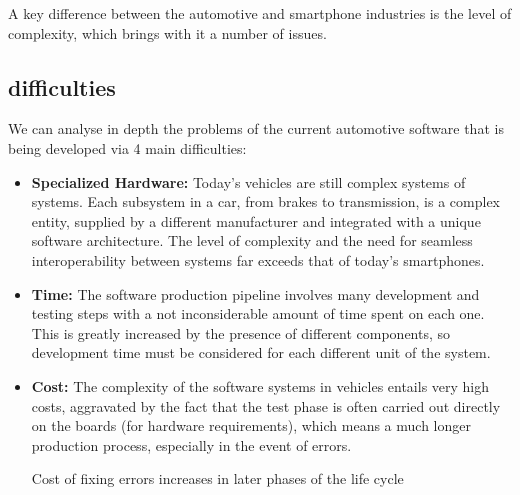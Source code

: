A key difference between the automotive and smartphone industries is the level of complexity, which brings with it a number of issues.

\subsection{difficulties}
We can analyse in depth the problems of the current automotive software that is being developed via 4 main difficulties:

\begin{itemize}
    \item \textbf{Specialized Hardware:} Today's vehicles are still complex systems of systems. Each subsystem in a car, from brakes to transmission, is a complex entity, supplied by a different manufacturer and integrated with a unique software architecture. The level of complexity and the need for seamless interoperability between systems far exceeds that of today's smartphones.
    \item \textbf{Time:} The software production pipeline involves many development and testing steps with a not inconsiderable amount of time spent on each one. This is greatly increased by the presence of different components, so development time must be considered for each different unit of the system.
    \item \textbf{Cost:} The complexity of the software systems in vehicles entails very high costs, aggravated by the fact that the test phase is often carried out directly on the boards (for hardware requirements), which means a much longer production process, especially in the event of errors.
    
    \begin{table}[h]
        \caption{Cost of fixing errors increases in later phases of the life cycle \cite{CostsOfSoftwareDeveloping}}
        \label{tab:CostsOfSoftwareDeveloping}
    \end{table}


\end{itemize}
